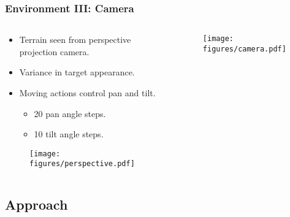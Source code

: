 \begin{frame}
    \frametitle{Environment III: Camera}
    \begin{columns}
        \begin{column}{0.5\textwidth}
            \begin{itemize}
                \item Terrain seen from perspective projection camera.
                \item Variance in target appearance.
                \item Moving actions control pan and tilt.
                \begin{itemize}
                    \item 20 pan angle steps.
                    \item 10 tilt angle steps.
                \end{itemize}
            \end{itemize}

            \begin{figure}
                \centering
                \texttt{[image: figures/perspective.pdf]}
            \end{figure}
        \end{column}
        \begin{column}{0.5\textwidth}
            \begin{figure}
                \centering
                \texttt{[image: figures/camera.pdf]}
            \end{figure}
        \end{column}
    \end{columns}
\end{frame}

\subsection{Approach}

